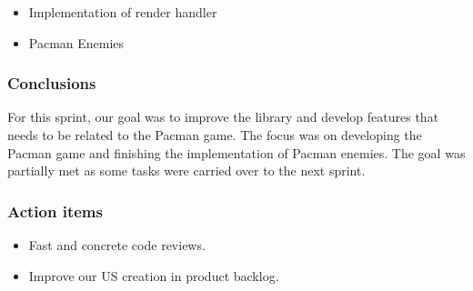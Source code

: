 \begin{itemize}
    \item Implementation of render handler
    \item Pacman Enemies
\end{itemize}




\subsubsection{Conclusions}
For this sprint, our goal was to improve the library and develop features that needs to be related to the Pacman game. The focus was on developing the Pacman game and finishing the implementation of Pacman enemies. The goal was partially met as some tasks were carried over to the next sprint.

\subsubsection{Action items}

\begin{itemize}
    \item Fast and concrete code reviews.
    \item Improve our US creation in product backlog.
\end{itemize}
